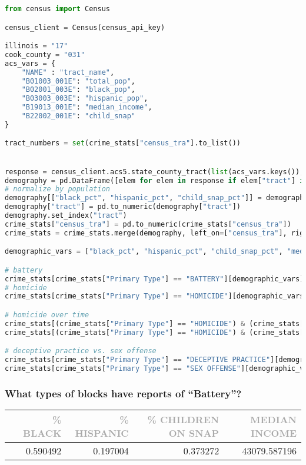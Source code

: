 \documentclass[11pt]{article}
\newcommand{\printsubsection}[1]{\normalfont\headerfontlt\textcolor{darkgray}{{#1}}}
\newcommand{\opns}[1]{\textrm{\small\printsubsection{\MakeUppercase{#1}}}}
\begin{document}
\begin{lstlisting}[language=Python,numbers=none]
from census import Census

census_client = Census(census_api_key)

illinois = "17"
cook_county = "031"
acs_vars = {
    "NAME" : "tract_name",
    "B01003_001E": "total_pop",
    "B02001_003E": "black_pop",
    "B03003_003E": "hispanic_pop",
    "B19013_001E": "median_income",
    "B22002_001E": "child_snap"
}

tract_numbers = set(crime_stats["census_tra"].to_list())


response = census_client.acs5.state_county_tract(list(acs_vars.keys()), illinois, cook_county, Census.ALL)
demography = pd.DataFrame([elem for elem in response if elem["tract"] in tract_numbers]).rename(columns=acs_vars)
# normalize by population
demography[["black_pct", "hispanic_pct", "child_snap_pct"]] = demography[["black_pop", "hispanic_pop", "child_snap"]].div(demography.total_pop, axis=0)
demography["tract"] = pd.to_numeric(demography["tract"])
demography.set_index("tract")
crime_stats["census_tra"] = pd.to_numeric(crime_stats["census_tra"])
crime_stats = crime_stats.merge(demography, left_on=["census_tra"], right_on=["tract"])

demographic_vars = ["black_pct", "hispanic_pct", "child_snap_pct", "median_income"]

# battery
crime_stats[crime_stats["Primary Type"] == "BATTERY"][demographic_vars].describe()
# homicide
crime_stats[crime_stats["Primary Type"] == "HOMICIDE"][demographic_vars].describe()

# homicide over time 
crime_stats[(crime_stats["Primary Type"] == "HOMICIDE") & (crime_stats["Year"] == 2017)][demographic_vars].describe()
crime_stats[(crime_stats["Primary Type"] == "HOMICIDE") & (crime_stats["Year"] == 2018)][demographic_vars].describe()

# deceptive practice vs. sex offense 
crime_stats[crime_stats["Primary Type"] == "DECEPTIVE PRACTICE"][demographic_vars].describe()
crime_stats[crime_stats["Primary Type"] == "SEX OFFENSE"][demographic_vars].describe()

\end{lstlisting}

\subsubsection{What types of blocks have reports of “Battery”?}
\begin{table}[H]
\centering\renewcommand{\arraystretch}{1.2}
\begin{tabular}{lrrrr}
   &     \opns{\% BLACK} &  \opns{\% HISPANIC} &  \opns{\% CHILDREN ON SNAP} &  \opns{MEDIAN INCOME} \\\hline
   &      0.590492 &      0.197004 &        0.373272 &   43079.587196 \\
\end{tabular}
\end{table}
\end{document}
